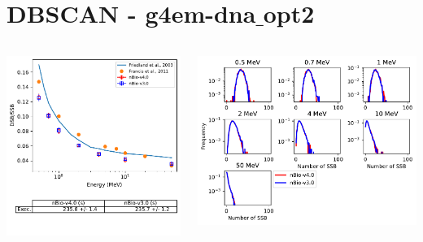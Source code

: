 \documentclass[aspectratio=1610]{beamer}
\begin{document}
\section{DBSCAN - g4em-dna$\_$opt2}

\begin{frame}{\secname}
 \begin{columns}
  \begin{column}{0.4\linewidth}
   \includegraphics[width=1.1\textwidth]{./DBSCAN/DBSCAN2_g4em-dna_opt2}
  \end{column}
  \begin{column}{0.6\linewidth} 
   \includegraphics[width=\textwidth]{./DBSCAN/DBSCAN1_g4em-dna_opt2}

\end{column}
\end{columns}
\end{frame}
\end{document}
